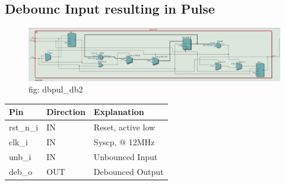 \documentclass[12pt,a4 paper] {report}
\begin{document}
\subsection{Debounc Input resulting in Pulse}
\begin{figure}[h]
	\centering	
	\includegraphics[scale=0.3]{../png/dbpul_db2.png}
	\newline
	fig: dbpul\_db2\\
\end{figure}
\begin{center}
	\begin{tabular}{| p{2cm} | p{2cm} | p{4cm} |}
		\hline
		Pin & Direction  & Explanation\\
		\hline	
  		rst\_n\_i & IN &  Reset, active low\\
  		\hline
		clk\_i   & IN   &  Syscp, @ 12MHz\\
		\hline
		unb\_i   & IN   & Unbounced Input\\
		\hline
		deb\_o   & OUT & Debounced Output \\
		\hline
		
	\end{tabular}
\end{center}
\newpage
\end{document}
